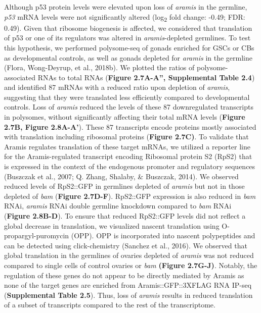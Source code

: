 \documentclass[12pt,oneside]{reedthesis}
\begin{document}
Although p53 protein levels were elevated upon loss of \emph{aramis} in the germline, \emph{p53} mRNA levels were not significantly altered (log\textsubscript{2} fold change: -0.49; FDR: 0.49). Given that ribosome biogenesis is affected, we considered that translation of p53 or one of its regulators was altered in \emph{aramis}-depleted germlines. To test this hypothesis, we performed polysome-seq of gonads enriched for GSCs or CBs as developmental controls, as well as gonads depleted for \emph{aramis} in the germline (Flora, Wong-Deyrup, et al., 2018b). We plotted the ratios of polysome-associated RNAs to total RNAs (\textbf{Figure 2.7A-A'', Supplemental Table 2.4}) and identified 87 mRNAs with a reduced ratio upon depletion of \emph{aramis}, suggesting that they were translated less efficiently compared to developmental controls. Loss of \emph{aramis} reduced the levels of these 87 downregulated transcripts in polysomes, without significantly affecting their total mRNA levels (\textbf{Figure 2.7B, Figure 2.8A-A'}). These 87 transcripts encode proteins mostly associated with translation including ribosomal proteins (\textbf{Figure 2.7C)}. To validate that Aramis regulates translation of these target mRNAs, we utilized a reporter line for the Aramis-regulated transcript encoding Ribosomal protein S2 (RpS2) that is expressed in the context of the endogenous promoter and regulatory sequences (Buszczak et al., 2007; Q. Zhang, Shalaby, \& Buszczak, 2014). We observed reduced levels of RpS2::GFP in germlines depleted of \emph{aramis} but not in those depleted of \emph{bam} (\textbf{Figure 2.7D-F}). RpS2::GFP expression is also reduced in \emph{bam} RNAi, \emph{aramis} RNAi double germline knockdown compared to \emph{bam} RNAi (\textbf{Figure 2.8B-D}). To ensure that reduced RpS2::GFP levels did not reflect a global decrease in translation, we visualized nascent translation using O-propargyl-puromycin (OPP). OPP is incorporated into nascent polypeptides and can be detected using click-chemistry (Sanchez et al., 2016). We observed that global translation in the germlines of ovaries depleted of \emph{aramis} was not reduced compared to single cells of control ovaries or \emph{bam} \textbf{(Figure 2.7G-J)}. Notably, the regulation of these genes do not appear to be directly mediated by Aramis as none of the target genes are enriched from Aramis::GFP::3XFLAG RNA IP-seq (\textbf{Supplemental Table 2.5}). Thus, loss of \emph{aramis} results in reduced translation of a subset of transcripts compared to the rest of the transcriptome.
\end{document}
